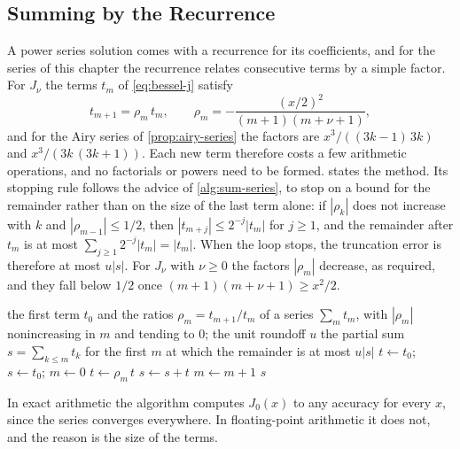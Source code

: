 \subsection{Summing by the Recurrence}

A power series solution comes with a recurrence for its coefficients, and for the series of this chapter the recurrence relates consecutive terms by a simple factor. For $J_\nu$ the terms $t_m$ of \eqref{eq:bessel-j} satisfy
\[
t_{m+1}=\rho_m\,t_m,\qquad\rho_m=-\frac{(x/2)^2}{(m+1)(m+\nu+1)},
\]
and for the Airy series of \cref{prop:airy-series} the factors are $x^3/((3k-1)\,3k)$ and $x^3/(3k\,(3k+1))$. Each new term therefore costs a few arithmetic operations, and no factorials or powers need to be formed.  states the method. Its stopping rule follows the advice of \cref{alg:sum-series}, to stop on a bound for the remainder rather than on the size of the last term alone: if $|\rho_k|$ does not increase with $k$ and $|\rho_{m-1}|\le1/2$, then $|t_{m+j}|\le2^{-j}|t_m|$ for $j\ge1$, and the remainder after $t_m$ is at most $\sum_{j\ge1}2^{-j}|t_m|=|t_m|$. When the loop stops, the truncation error is therefore at most $u|s|$. For $J_\nu$ with $\nu\ge0$ the factors $|\rho_m|$ decrease, as required, and they fall below $1/2$ once $(m+1)(m+\nu+1)\ge x^2/2$.

\begin{algorithm}
\begin{algorithmic}[1]
\Require the first term $t_0$ and the ratios $\rho_m=t_{m+1}/t_m$ of a series $\sum_mt_m$, with $|\rho_m|$ nonincreasing in $m$ and tending to $0$; the unit roundoff $u$
\Ensure the partial sum $s=\sum_{k\le m}t_k$ for the first $m$ at which the remainder is at most $u|s|$
\State $t\gets t_0$; $s\gets t_0$; $m\gets0$
\Repeat
  \State $t\gets\rho_m\,t$ 
  \State $s\gets s+t$
  \State $m\gets m+1$
\State \Return $s$
\end{algorithmic}
\caption{Summing a series whose terms are generated by a recurrence. The test on $\rho_{m-1}$ ensures that the remaining terms decrease at least geometrically, so that their sum is at most $|t|$; rounding errors are not taken into account.}
\label{alg:series-recurrence}
\end{algorithm}

In exact arithmetic the algorithm computes $J_0(x)$ to any accuracy for every $x$, since the series converges everywhere. In floating-point arithmetic it does not, and the reason is the size of the terms.

